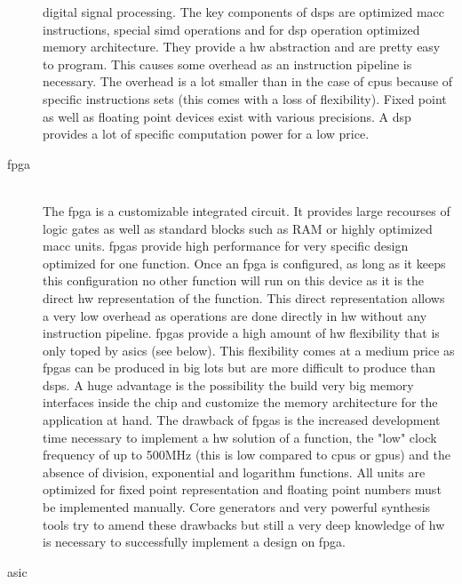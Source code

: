 \documentclass[mscthesis]{usiinfthesis}
\begin{document}
\begin{description}
        digital signal processing. The key components of \glspl{dsp} are
        optimized \gls{macc} instructions, special \gls{simd}
        operations and for \gls{dsp} operation optimized memory architecture.
        They provide a \gls{hw} abstraction and are pretty easy to program.
        This causes some overhead as an instruction pipeline is necessary. The
        overhead is a lot smaller than in the case of \glspl{cpu} because of
        specific instructions sets (this comes with a loss of flexibility).
        Fixed point as well as floating point devices exist with various
        precisions. A \gls{dsp} provides a lot of specific computation power
        for a low price.
    \item[\acrshort{fpga}] \hfill \\
        The \acrfull{fpga} is a customizable integrated circuit.  It provides
        large recourses of logic gates as well as standard blocks such as RAM
        or highly optimized \gls{macc} units. \glspl{fpga} provide
        high performance for very specific design optimized for one function.
        Once an \gls{fpga} is configured, as long as it keeps this
        configuration no other function will run on this device as it is the
        direct \gls{hw} representation of the function. This direct
        representation allows a very low overhead as operations are done
        directly in \gls{hw} without any instruction pipeline. \glspl{fpga}
        provide a high amount of \gls{hw} flexibility that is only toped by
        \glspl{asic} (see below). This flexibility comes at a medium price as
        \glspl{fpga} can be produced in big lots but are more difficult to
        produce than \glspl{dsp}.  A huge advantage is the possibility the
        build very big memory interfaces inside the chip and customize the
        memory architecture for the application at hand. The drawback of
        \glspl{fpga} is the increased development time necessary to implement
        a \gls{hw} solution of a function, the "low" clock frequency of up to
        500MHz (this is low compared to \glspl{cpu} or \glspl{gpu}) and the
        absence of division, exponential and logarithm functions. All units are
        optimized for fixed point representation and floating point numbers
        must be implemented manually.  Core generators and very powerful
        synthesis tools try to amend these drawbacks but still a very deep
        knowledge of \gls{hw} is necessary to successfully implement a design
        on \gls{fpga}.
    \item[\acrshort{asic}] \hfill \\

\end{description}
\end{document}
